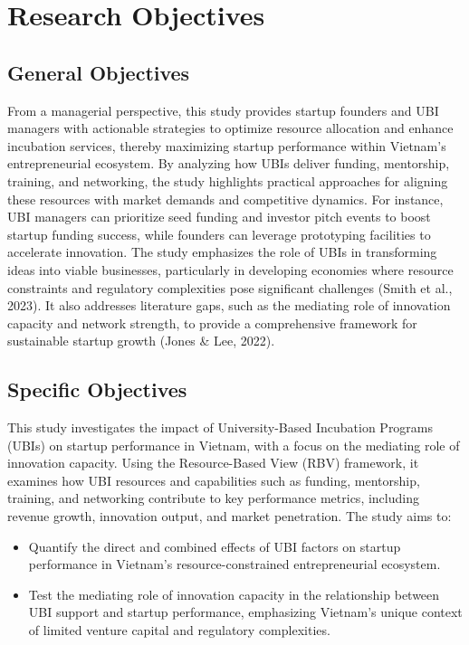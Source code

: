 \documentclass[../Main.tex]{subfiles}
\begin{document}
	\section{Research Objectives}
	\label{section:1.2_Research_objectives}

	\subsection{General Objectives}
	\label{subsection:1.2.1_General_objectives}
	From a managerial perspective, this study provides startup founders and UBI managers with actionable strategies to optimize resource allocation and enhance incubation services, thereby maximizing startup performance within Vietnam's entrepreneurial ecosystem. By analyzing how UBIs deliver funding, mentorship, training, and networking, the study highlights practical approaches for aligning these resources with market demands and competitive dynamics. For instance, UBI managers can prioritize seed funding and investor pitch events to boost startup funding success, while founders can leverage prototyping facilities to accelerate innovation. The study emphasizes the role of UBIs in transforming ideas into viable businesses, particularly in developing economies where resource constraints and regulatory complexities pose significant challenges (Smith et al., 2023). It also addresses literature gaps, such as the mediating role of innovation capacity and network strength, to provide a comprehensive framework for sustainable startup growth (Jones \& Lee, 2022).

	\subsection{Specific Objectives}
	\label{subsection:1.2.2_Specific_objectives}
	This study investigates the impact of University-Based Incubation Programs (UBIs) on startup performance in Vietnam, with a focus on the mediating role of innovation capacity. Using the Resource-Based View (RBV) framework, it examines how UBI resources and capabilities such as funding, mentorship, training, and networking contribute to key performance metrics, including revenue growth, innovation output, and market penetration. The study aims to:
	\begin{itemize}
		\item Quantify the direct and combined effects of UBI factors on startup performance in Vietnam's resource-constrained entrepreneurial ecosystem.
		\item Test the mediating role of innovation capacity in the relationship between UBI support and startup performance, emphasizing Vietnam's unique context of limited venture capital and regulatory complexities.
	\end{itemize}
\end{document}
